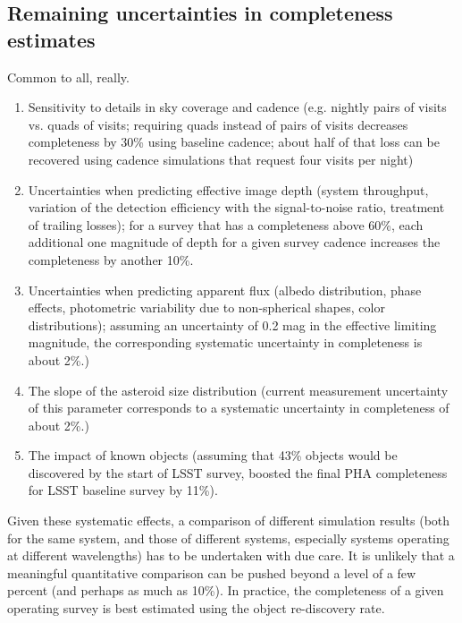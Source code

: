\subsection{Remaining uncertainties in completeness estimates}

Common to all, really.          

\begin{enumerate}
\item Sensitivity to details in sky coverage and cadence (e.g. nightly pairs of visits vs. quads of visits;
          requiring quads instead of pairs of visits decreases completeness by 30\% using baseline cadence; 
          about half of that loss can be recovered using cadence simulations that request four visits per night) 
\item Uncertainties when predicting effective image depth (system throughput, variation of the detection efficiency
          with the signal-to-noise ratio, treatment of trailing losses); for a survey that has a completeness above 60\%, 
          each additional one magnitude of depth for a given survey cadence increases the completeness by another 10\%.
\item Uncertainties when predicting apparent flux (albedo distribution, phase effects, photometric variability 
          due to non-spherical shapes, color distributions); assuming an uncertainty of 0.2 mag in the effective 
          limiting magnitude, the corresponding  systematic uncertainty in completeness is about 2\%.)
\item The slope of the asteroid size distribution (current measurement uncertainty of this parameter 
          corresponds to a systematic uncertainty in completeness of about 2\%.)
\item The impact of known objects (assuming that 43\% objects would be discovered by the start of
          LSST survey, \citep{GMS2016} boosted the final PHA completeness for LSST baseline survey by 11\%). 
\end{enumerate} 

Given these systematic effects, a comparison of different simulation results (both for the same system,
and those of different systems, especially systems operating at different wavelengths) has to be undertaken
with due care. It is unlikely that a meaningful quantitative comparison can be pushed beyond a level
of a few percent (and perhaps as much as 10\%). In practice, the completeness of a given operating survey
is best estimated using the object re-discovery rate. 

